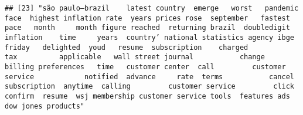 \documentclass[
]{article}
\begin{document}
\begin{verbatim}
## [23] "são paulo—brazil    latest country  emerge   worst   pandemic   face  highest inflation rate  years prices rose  september   fastest pace   month     month figure reached  returning brazil  doubledigit inflation    time     years  country’ national statistics agency ibge  friday   delighted  youd   resume  subscription    charged           tax          applicable   wall street journal           change  billing preferences   time   customer center  call         customer service            notified  advance     rate  terms           cancel  subscription  anytime  calling         customer service         click confirm  resume  wsj membership customer service tools  features ads  dow jones products"                                                                                                                                                                                                                                                                                                                                                                                                                                                                                                                                                                                                                                                                                                                                                                                                                                                                                                                                                                                                                                                                                                                                                                                                                                                                                                                                                                                                                                                                                                                                                                                                                                                                                                                                                                                                                                                                                                                                                                                                                                                                                                                                                                                                                                                                                                                                                                                                                                                                                                                                                                                                                                                                                                              
\end{verbatim}
\end{document}
